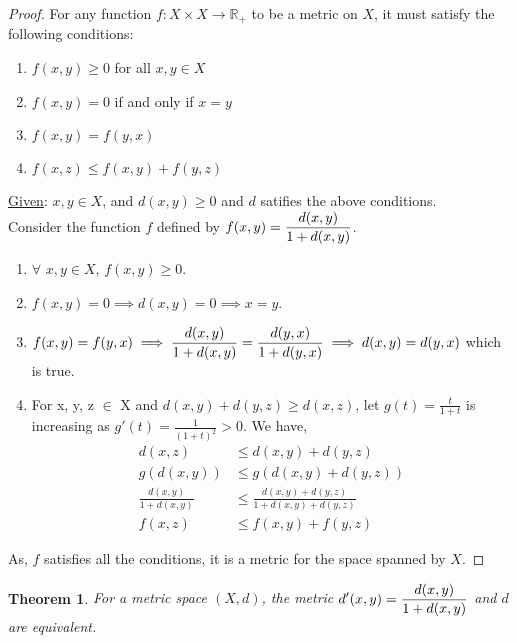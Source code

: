 \documentclass[12pt]{article}
\newtheorem{theorem}{Theorem}
\begin{document}
\begin{proof}
    For any function $f:X \times X \to \mathbb{R_+}$ to be a metric on $X$, it must satisfy the following conditions:
    \begin{enumerate}
        \item $f(x, y) \ge 0$ for all $x, y \in X$
        \item $f(x, y) = 0$ if and only if $x = y$
        \item $f(x, y) = f(y, x)$
        \item $f(x, z) \le f(x, y) + f(y, z)$
    \end{enumerate}
    \underline{Given}: $x, y \in X$, and $d(x, y) \ge 0$ and $d$ satifies the above conditions.
    \\
    Consider the function $f$ defined by $\mathlarger{f(x,y) = \frac{d(x,y)}{1+d(x,y)}}$.
    \begin{enumerate}
        \item $\forall$ $x, y \in X$, $f(x, y) \ge 0$.
        \item $f(x, y) = 0 \implies d(x, y) = 0 \implies x = y$.
        \item $\mathlarger{f(x, y) = f(y, x) \implies \frac{d(x, y)}{1+d(x, y)} = \frac{d(y, x)}{1+d(y, x)} \implies d(x, y) = d(y, x)}$ which is true.
        \item For x, y, z $\in$ X and $d(x,y) + d(y, z) \ge d(x, z)$, let $g(t) = \frac{t}{1+t}$ is increasing as $g'(t) = \frac{1}{(1+t)^2} > 0$. We have,
        \begin{align*}
            d(x, z) &\le d(x, y) + d(y, z) \\
            g(d(x, y)) &\le g(d(x, y) + d(y, z)) \\
            \frac{d(x, y)}{1+d(x, y)} &\le \frac{d(x, y) + d(y, z)}{1+d(x, y)+d(y, z)} \\
            f(x, z) &\le f(x, y) + f(y, z)
        \end{align*}
    \end{enumerate}
    As, $f$ satisfies all the conditions, it is a metric for the space spanned by $X$.
\end{proof}
\vspace{0.4cm}
\begin{theorem}
    For a metric space $(X, d)$, the metric $\mathlarger{d'(x,y) = \frac{d(x,y)}{1+d(x,y)}}$ and $d$ are equivalent.
\end{theorem}
\end{document}
